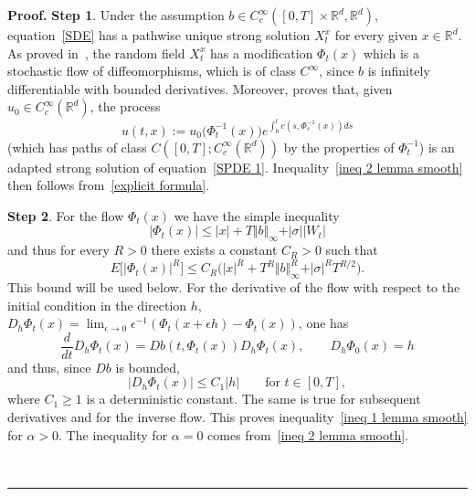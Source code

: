 \documentclass[a4paper,10pt]{article}
\newenvironment{proof}[1][Proof]{\noindent\textbf{#1.} }{\ \rule{0.5em}{0.5em}}
\begin{document}
\begin{proof}
\textbf{Step 1}. Under the assumption $b\in C_{c}^{\infty}([0,T] \times\mathbb{R}^{d},\mathbb{R}^{d})$, equation~\eqref{SDE} has a pathwise unique strong solution $X_{t}^{x}$ for every given
$x\in\mathbb{R}^{d}$. As proved in~\cite{KUNITA84}, the random field $X_{t}^{x}$ has
a modification $\Phi_{t}(x)$ which is a stochastic flow of
diffeomorphisms, which is of class $C^{\infty}$, since $b$ is infinitely differentiable
with bounded derivatives. Moreover, \cite[Theorem~6.1.9]{KUNITA90} proves that,
given $u_{0}\in C_{c}^{\infty}(\mathbb{R}^{d})$, the process
\begin{equation}
u(t,x)  :=u_{0}\big(\Phi_{t}^{-1}(x) \big) e^{\int_{0}^{t}c(s,\Phi_{s}^{-1}(x))
ds}\label{explicit formula}
\end{equation}
(which has paths of class $C([0,T];C^{\infty}_c(\mathbb{R}^{d}))$ by the properties of $\Phi_{t}^{-1}$) is an adapted strong solution of equation~\eqref{SPDE 1}. Inequality~\eqref{ineq 2 lemma smooth} then follows from~\eqref{explicit formula}.

\textbf{Step 2}. For the flow $\Phi_{t}(x)$ we have the simple
inequality 
\[
\vert \Phi_{t}(x) \vert \leq \vert x \vert +T \Vert b \Vert_{\infty}+ \vert \sigma \vert \vert
W_{t} \vert
\]
and thus for every $R>0$ there exists a constant $C_{R}>0$ such that
\begin{equation}
E\big[ \vert \Phi_{t}(x) \vert^{R} \big] \leq
C_{R} \big( \vert x \vert^{R}+ T^{R} \Vert b\Vert_{\infty}^{R}+ \vert \sigma \vert^{R} T^{R/2}\big) .
\label{bound on the flow}
\end{equation}
This bound will be used below. For the derivative of the flow with respect to
the initial condition in the direction $h$, $D_{h}\Phi_{t}(x)
=\lim_{\epsilon\rightarrow0} \epsilon^{-1} ( \Phi_{t}(x+\epsilon h)-\Phi_{t}(x) )$, one has
\[
\frac{d}{dt}D_{h}\Phi_{t}(x)  =Db(t,\Phi_{t}(x))  D_{h}\Phi_{t}(x)  , \qquad D_{h}\Phi_{0}(x)  =h
\]
and thus, since $Db$ is bounded,
\begin{equation}
\vert D_{h}\Phi_{t}(x) \vert \leq C_{1} \vert h \vert \qquad \text{for } t\in [0,T],  \label{ineq smooth uniform} 
\end{equation}
where $C_1 \geq 1$ is a deterministic constant. The same is true for subsequent
derivatives and for the inverse flow. This proves inequality~\eqref{ineq 1 lemma smooth} for $\alpha>0$. The inequality for $\alpha=0$
comes from~\eqref{ineq 2 lemma smooth}.


\end{proof}
\end{document}
